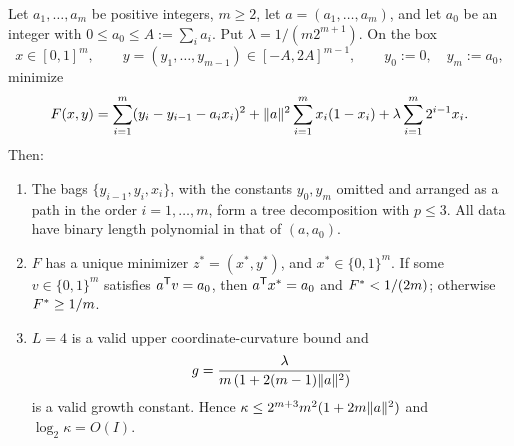 \begin{proposition}\label{lim:prop:unique}
Let $a_1,\ldots,a_m$ be positive integers, $m\ge2$, let $a=(a_1,\ldots,a_m)$,
and let $a_0$ be an integer with $0\le a_0\le A:=\sum_ia_i$. Put
$\lambda=1/(m2^{m+1})$. On the box
\[
x\in[0,1]^m,\qquad y=(y_1,\ldots,y_{m-1})\in[-A,2A]^{m-1},
\qquad y_0:=0,\quad y_m:=a_0,
\]
minimize
\[
F(x,y)=\sum_{i=1}^m(y_i-y_{i-1}-a_ix_i)^2
+\lVert a\rVert^2\sum_{i=1}^mx_i(1-x_i)+\lambda\sum_{i=1}^m2^{i-1}x_i .
\]
Then:
\begin{enumerate}
\item The bags $\{y_{i-1},y_i,x_i\}$, with the constants $y_0,y_m$ omitted
  and arranged as a path in the order $i=1,\ldots,m$, form a tree
  decomposition with $p\le3$. All data have binary length polynomial in
  that of $(a,a_0)$.
\item $F$ has a unique minimizer $z^*=(x^*,y^*)$, and $x^*\in\{0,1\}^m$.
  If some $v\in\{0,1\}^m$ satisfies $a^{\mathsf T}v=a_0$, then
  $a^{\mathsf T}x^*=a_0$ and $F^{*}<1/(2m)$; otherwise $F^{*}\ge1/m$.
\item $L=4$ is a valid upper coordinate-curvature bound and
  \[
  g=\frac{\lambda}{m\,(1+2(m-1)\lVert a\rVert^2)}
  \]
  is a valid growth constant. Hence
  $\kappa\le2^{m+3}m^2(1+2m\lVert a\rVert^2)$ and $\log_2\kappa=O(I)$.
\end{enumerate}
\end{proposition}

